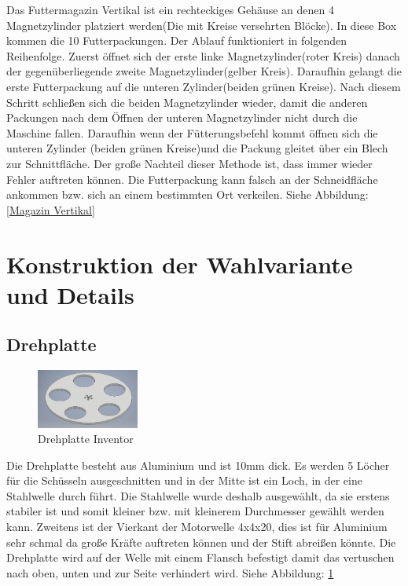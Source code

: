 Das Futtermagazin Vertikal ist ein rechteckiges Gehäuse an denen 4 Magnetzylinder platziert werden(Die mit Kreise versehrten Blöcke). In diese Box kommen die 10 Futterpackungen. Der Ablauf funktioniert in folgenden Reihenfolge. Zuerst öffnet sich der erste linke Magnetzylinder(roter Kreis) danach der gegenüberliegende zweite Magnetzylinder(gelber Kreis). Daraufhin gelangt die erste Futterpackung auf die unteren Zylinder(beiden grünen Kreise). Nach diesem Schritt schließen sich die beiden Magnetzylinder wieder, damit die anderen Packungen nach dem Öffnen der unteren Magnetzylinder nicht durch die Maschine fallen. Daraufhin wenn der Fütterungsbefehl kommt öffnen sich die unteren Zylinder (beiden grünen Kreise)und die Packung gleitet über ein Blech zur Schnittfläche. Der große Nachteil dieser Methode ist, dass immer wieder Fehler auftreten können. Die Futterpackung kann falsch an der Schneidfläche ankommen bzw. sich an einem bestimmten Ort verkeilen. Siehe Abbildung: \ref{Magazin Vertikal}


\section{Konstruktion der Wahlvariante und Details}

\subsection{Drehplatte}

\begin{figure}
\vspace{-20pt}
  \begin{center}
    \includegraphics[width=0.30\textwidth]{Bilder/Inventor/Drehplatte}
  \end{center}
  \caption{Drehplatte Inventor}
  \label{Drehplatte_Inventor}
  \vspace{-10pt}
\end{figure}

Die Drehplatte besteht aus Aluminium und ist 10mm dick. Es werden 5 Löcher für die Schüsseln ausgeschnitten und in der Mitte ist ein Loch, in der eine Stahlwelle durch führt. Die Stahlwelle wurde deshalb ausgewählt, da sie erstens stabiler ist und somit kleiner bzw. mit kleinerem Durchmesser gewählt werden kann. Zweitens ist der Vierkant der Motorwelle 4x4x20, dies ist für Aluminium sehr schmal da große Kräfte auftreten können und der Stift abreißen könnte. Die Drehplatte wird auf der Welle mit einem Flansch befestigt damit das vertuschen nach oben, unten und zur Seite verhindert wird. Siehe Abbildung: \ref{Drehplatte_Inventor} \\

